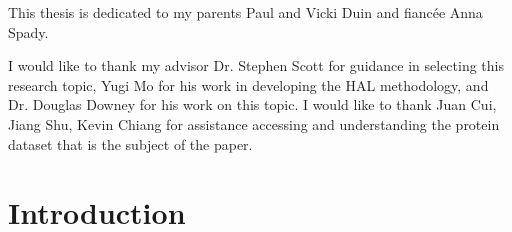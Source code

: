 \documentclass[ms]{nuthesis}
\begin{document}

\begin{dedication}
  This thesis is dedicated to my parents Paul and Vicki Duin and fianc\'{e}e Anna Spady.
\end{dedication}

\begin{acknowledgments}
  I would like to thank my advisor Dr. Stephen Scott for guidance in selecting this
  research topic, Yugi Mo for his work in developing the HAL methodology, and Dr.
  Douglas Downey for his work on this topic. I would like to thank Juan Cui, Jiang Shu,
  Kevin Chiang for assistance accessing and understanding the protein dataset that is
  the subject of the paper.
\end{acknowledgments}


\tableofcontents

\mainmatter

\chapter{Introduction}\label{chap:aenied}
\end{document}
